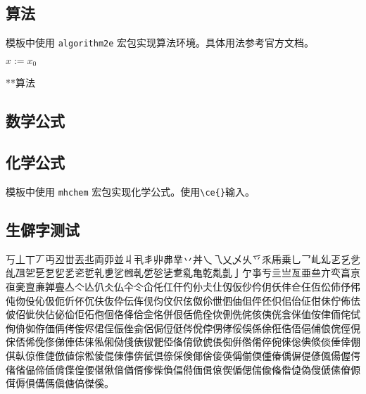 \subsection{算法}
模板中使用 \texttt{algorithm2e} 宏包实现算法环境。具体用法参考官方文档。

\begin{algorithm}
  \SetAlgoLined
  $x:=x_{0}$\;
  \caption{**算法}
  \label{algo:algorithm1}
\end{algorithm}

\nocite{*}


\subsection{数学公式}


\subsection{化学公式}
模板中使用 \texttt{mhchem} 宏包实现化学公式。使用\verb|\ce{}|输入。

\begin{center}




\end{center}



\subsection{生僻字测试}
丂丄丅丆丏丒丗丟丠両丣並丩丮丯丱丳丵丷丼乀乁乂乄乆乊乑乕乗乚乛乢乣乤乥乧乨乪乫乬乭乮乯乲乴乵乶乷乸乹乺乻乼乽乿亀亁亃亄亅亇亊亐亖亗亙亜亝亣亪亯亰亱亴亶亷亸亹亼亽亾仈仌仏仐仒仚仛仜仠仢仦仧仩仭仮仯仱仴仸仹仺仼仾伀伂伃伄伅伆伇伈伋伌伒伓伔伕伖伜伝伡伣伨伩伬伭伮伱伳伵伷伹伻伾伿佀佁佂佄佅佇佈佉佊佋佌佒佔佖佡佢佦佨佪佫佭佮佱佲併佷佸佹佺佽侀侁侂侅侇侊侌侎侐侒侓侕侘侙侚侜侞侟価侢侤侫侭侰侱侲侳侴侶侷侸侹侺侻侼侽侾俀俁係俆俇俈俉俋俌俍俒俓俔俕俖俙俛俢俤俥俧俫俬俰俲俴俵俶俷俹俻俼俽俿倀倁倂倃倄倅倇倈倊倎倐倓倕倖倗倛倝倞倠倢倣値倧倯倰倱倲倳倴倵倶倷倸倹倻倽倿偀偁偂偄偅偆偊偋偍偐偑偒偓偔偖偗偘偙偛偝偞偟偠偡偢偣偤偦偧偨偩偪偫偭偮偯偰偱偲偳偸偹偺偼偽傁傂傃傄傆傇傉傊傋傌傎傏傐傑傒。

